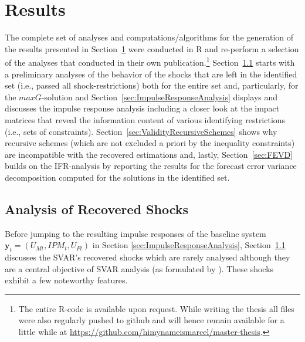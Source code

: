 \documentclass[a4paper,11pt,listof=nochaptergap,oneside,pointednumbers,bibtotoc,bigheadings,liststotoc,hidelinks]{scrbook}
\theoremstyle{mysatz}
\theoremstyle{mydefinition}
\theoremstyle{mytheorem}
\theoremstyle{mybemerkung}
\newcommand{\vect}[1]{\boldsymbol{\mathbf{#1}}}
\begin{document}
\chapter{Results}
\label{Results}

The complete set of analyses and computations/algorithms for the generation of the results presented in Section~\ref{Results} were conducted in R and re-perform a selection of the analyses that \citet{ludvigsonetal:19} conducted in their own publication.\footnote{The entire R-code is available upon request. While writing the thesis all files were also regularly pushed to github and will hence remain available for a little while at \url{https://github.com/himynameismarcel/master-thesis}.} Section~\ref{sec:uncertaintyShocks} starts with a preliminary analyses of the behavior of the shocks that are left in the identified set (i.e., passed all shock-restrictions) both for the entire set and, particularly, for the $maxG$-solution and Section~\ref{sec:ImpulseResponseAnalysis} displays and discusses the impulse response analysis including a closer look at the impact matrices that reveal the information content of various identifying restrictions (i.e., sets of constraints). Section~\ref{sec:ValidityRecursiveSchemes} shows why recursive schemes (which are not excluded a priori by the inequality constraints) are incompatible with the recovered estimations and, lastly, Section~\ref{sec:FEVD} builds on the IFR-analysis by reporting the results for the forecast error variance decomposition computed for the solutions in the identified set.


\section{Analysis of Recovered Shocks}
\label{sec:uncertaintyShocks}

Before jumping to the resulting impulse responses of the baseline system $\vect{y}_t = (U_{Mt}, IPM_{t}, U_{Ft})$ in Section \ref{sec:ImpulseResponseAnalysis}, Section~\ref{sec:uncertaintyShocks} discusses the SVAR's recovered shocks which are rarely analysed although they are a central objective of SVAR analysis (as formulated by \citealp{ludvigsonetal:20a}). These shocks exhibit a few noteworthy features.\\
\end{document}
